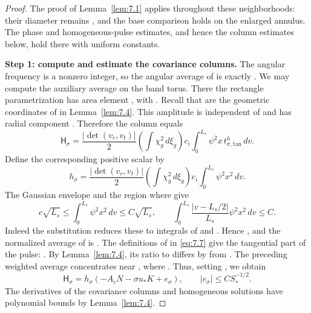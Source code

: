 \begin{proof}
The proof of Lemma~\ref{lem:7.1} applies throughout these neighborhoods: their
diameter remains , and the base comparison
holds on the enlarged annulus. The phase and homogeneous-pulse estimates, and
hence the column estimates below, hold there with uniform constants.

\textbf{Step 1: compute and estimate the covariance columns.}
The angular frequency  is a nonzero integer, so the
angular average of  is exactly
. We may compute the auxiliary average on the band
torus. There the rectangle parametrization has area element
, with
. Recall that
 are the geometric coordinates of
 in Lemma~\ref{lem:7.4}. This amplitude is
independent of  and has radial component
. Therefore the column
 equals
\begin{equation}
  \mathsf H_\sigma=
  \frac{|\det(v_r,v_t)|}{2}
  \left(\int\chi_g^2\,d\xi_g\right)c_i
  \int_0^{L_s}\psi^2x\,t^h_{\sigma,\mathrm{tan}}\,dv.
  \tag{7.27}\label{eq:7.27}
\end{equation}
%
Define the corresponding positive scalar by
\[
  h_\sigma=
  \frac{|\det(v_r,v_t)|}{2}
  \left(\int\chi_g^2\,d\xi_g\right)c_i
  \int_0^{L_s}\psi^2x^2\,dv.
\]
The Gaussian envelope and the region where  give
\[
  c\sqrt{L_s}\leq\int_0^{L_s}\psi^2x^2\,dv\leq C\sqrt{L_s},
  \qquad
  \int_0^{L_s}\frac{|v-L_s/2|}{L_s}\psi^2x^2\,dv\leq C.
\]
Indeed the substitution
 reduces these to integrals of
 and
. Hence
, and the
normalized  average of
 is
. The definitions of
 in \eqref{eq:7.7} give the tangential part
of the pulse:
. By
Lemma~\ref{lem:7.4}, its ratio to  differs by
 from
. The preceding weighted
average concentrates near , where
. Thus, setting
, we obtain
\begin{equation}
  \mathsf H_\sigma=h_\sigma(-A_cN-\sigma u_*K+e_\sigma),
  \qquad |e_\sigma|\leq CS_*^{-1/2}.
  \tag{7.28}\label{eq:7.28}
\end{equation}
The derivatives of the covariance columns and homogeneous solutions have
polynomial bounds by Lemma~\ref{lem:7.4}.


\end{proof}
